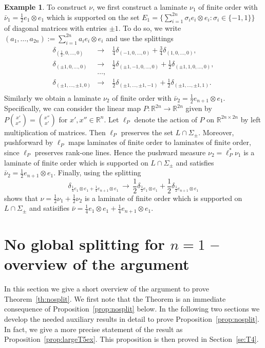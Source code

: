 \documentclass[titlepage]{amsart}
\numberwithin{equation}{section}
\theoremstyle{plain}
\theoremstyle{definition}
\newtheorem{example}[equation]{Example}
\theoremstyle{remark}
\newcommand{\lra}{\longrightarrow}
\newcommand{\R}{\mathbb{R}}
\begin{document}
\begin{example}
To construct $\nu$, we first construct a laminate $\nu_1$ of finite order with $\bar \nu_1 = \frac12 e_1 \otimes e_1$
which is supported on  the set $E_1 = \{  \sum_{i=1}^{2n} \sigma_i e_i \otimes e_i : \sigma_i \in \{-1,1\} \}$
of diagonal matrices with entries $\pm 1$. 
To do so,  we write $(a_1, \ldots, a_{2n}) := \sum_{i=1}^{2n} a_i e_i \otimes e_i$ and use the splittings
\begin{eqnarray*}
\delta_{(\tfrac12, 0, \ldots, 0)} & \lra & \frac14  \delta_{(-1, 0, \ldots, 0)} + \frac34 \delta_{(1,0, \ldots, 0)}, \\
\delta_{(\pm 1, 0, \ldots, 0)} & \lra & \frac12  \delta_{(\pm 1, -1, 0, \ldots, 0)} + \frac12 \delta_{(\pm 1, 1, 0 , \ldots, 0)}, \\
&\ldots,  & \\
\delta_{(\pm1 ,  \ldots, \pm 1,  0)} & \lra & \frac12  \delta_{(\pm 1, \ldots, \pm 1,  -1)} + \frac12 \delta_{(\pm1, \ldots, \pm 1, 1)}. \\
\end{eqnarray*}
Similarly we obtain a laminate $\nu_2$ of finite order with $\bar \nu_2 = \frac12 e_{n+1} \otimes e_1$. Specifically, we can consider the linear  map 
$P : \R^{2n} \to \R^{2n}$ given by $P\binom{x'}{x''} = \binom{x''}{x'}$ for $x', x'' \in \R^n$. Let $\ell_P$ denote  the action of $P$  on $\R^{2n \times 2n}$ by left multiplication
of matrices. Then $\ell_P$ preserves the set $L \cap \Sigma_\pm$.   Moreover, pushforward by $\ell_P$ maps laminates of finite order to laminates of finite 
order,  since $\ell_P$ preserves rank-one lines. Hence the pushward measure $\nu_2 = \ell_P^* \nu_1$
 is a laminate of finite order which is supported on $L \cap \Sigma_\pm$
and satisfies $\bar \nu_2 =\frac12 e_{n+1} \otimes e_1$. 
Finally,  using the splitting
$$ \delta_{\tfrac14 e_1 \otimes e_1 + \tfrac14 e_{n+1} \otimes e_1} \, \lra \, \frac12 \delta_{\tfrac12 e_1 \otimes e_1} + \frac12 \delta_{\tfrac12 e_{n+1} \otimes e_1}$$
shows that $\nu = \frac12 \nu_1 + \frac12 \nu_2$ is a laminate of finite order  which is supported on $L \cap \Sigma_\pm$ and satisifies
$\bar \nu = \frac14 e_1 \otimes e_1 + \frac14 e_{n+1} \otimes e_1$.
\end{example}


\section{No global splitting for $n = 1$ -- overview of the argument}  \label{se:nosplit}
In this section we give a short  overview  of the  argument to prove  Theorem~\ref{th:nosplit}.
We first note that the Theorem is an immediate consequence of Proposition~\ref{prop:nosplit} below.
In the following two sections we develop the needed auxiliary results in detail to prove Proposition~\ref{prop:nosplit}.
In fact, we give a more precise statement of the result as Proposition~\ref{prop:largeT5ex}. This proposition is then proved in 
Section~\ref{se:T4}.
\end{document}
